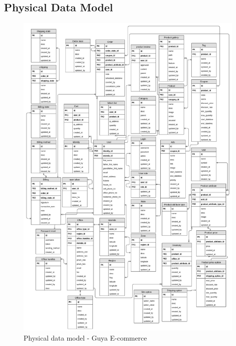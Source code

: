 \subsection{Physical Data Model}
\begin{figure}[!h]
\includegraphics[width=17cm, keepaspectratio]{usecases/shop_database_diagram}
\caption{Physical data model - Guya E-commerce}
\end{figure}
\clearpage

